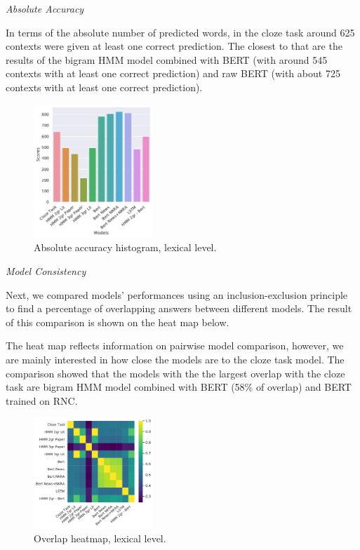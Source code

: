 \documentclass[a4paper]{article}
\newcommand{\head}[1]{\vspace{0.5em}\emph{#1}\vspace{0.25em}}
\begin{document}
\head{Absolute Accuracy}

In terms of the absolute number of predicted words, in the cloze task around 625 contexts were given at least one correct prediction. The closest to that are the results of the bigram HMM model combined with BERT (with around 545 contexts with at least one correct prediction) and raw BERT (with about 725 contexts with at least one correct prediction).

\begin{figure}
\caption{Absolute accuracy histogram, lexical level.}
\label{fig:abs-accuracy-hist-lex}
\centering
\includegraphics[width=0.4\textwidth]{figures/pdf/abs-accuracy-hist-lex.pdf}
\end{figure}

\head{Model Consistency}

Next, we compared models’ performances using an inclusion-exclusion principle to find a percentage of overlapping answers between different models. The result of this comparison is shown on the heat map below.

The heat map reflects information on pairwise model comparison,
however, we are mainly interested in how close the models are to the
cloze task model. The comparison showed that the models with the
the largest overlap with the cloze task are bigram HMM model combined
with BERT (58\% of overlap) and BERT trained on RNC.

\begin{figure}
\caption{Overlap heatmap, lexical level.}
\label{fig:heatmap-context-accord-lex}
\centering
\includegraphics[width=0.4\textwidth]{figures/pdf/heatmap-context-accord-lex.pdf}
\end{figure}
\end{document}

